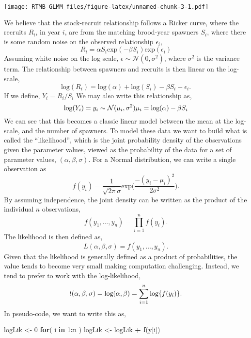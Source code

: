 \documentclass[
]{article}
\newenvironment{Shaded}{\begin{snugshade}}{\end{snugshade}}
\newcommand{\ControlFlowTok}[1]{\textcolor[rgb]{0.13,0.29,0.53}{\textbf{#1}}}
\newcommand{\DecValTok}[1]{\textcolor[rgb]{0.00,0.00,0.81}{#1}}
\newcommand{\FunctionTok}[1]{\textcolor[rgb]{0.13,0.29,0.53}{\textbf{#1}}}
\newcommand{\NormalTok}[1]{#1}
\newcommand{\OtherTok}[1]{\textcolor[rgb]{0.56,0.35,0.01}{#1}}
\newcommand{\SpecialCharTok}[1]{\textcolor[rgb]{0.81,0.36,0.00}{\textbf{#1}}}
\begin{document}
\texttt{[image: RTMB\_GLMM\_files/figure-latex/unnamed-chunk-3-1.pdf]}

We believe that the stock-recruit relationship follows a Ricker curve,
where the recruits \(R_i\), in year \(i\), are from the matching
brood-year spawners \(S_i\), where there is some random noise on the
observed relationship \(\epsilon_i\), \[
  R_i = \alpha S_i \text{exp}(-\beta S_i) \text{exp}(\epsilon_i)
\] Assuming white noise on the log scale,
\(\epsilon \sim \mathcal{N}(0,\sigma^2)\), where \(\sigma^2\) is the
variance term. The relationship between spawners and recruits is then
linear on the log-scale, \[
  \text{log}(R_i) = \text{log}(\alpha) + \text{log}(S_i) - \beta S_i + \epsilon_i.
\] If we define, \(Y_i = R_i/S_i\) We may also write this relationship
as, \[
  \text{log}(Y_i) = y_i \sim \mathcal{N}(\mu_i, \sigma^2)\\
  \mu_i = \text{log}(\alpha) - \beta S_i
\] We can see that this becomes a classic linear model between the mean
at the log-scale, and the number of spawners. To model these data we
want to build what is called the ``likelihood'', which is the joint
probability density of the observations given the parameter values,
viewed as the probability of the data for a set of parameter values,
\((\alpha, \beta, \sigma)\). For a Normal distribution, we can write a
single observation as \[
  f(y_i) = \frac{1}{\sqrt{2\pi}\sigma}\text{exp}\Big(\frac{-(y_i-\mu_i)^2}{2\sigma^2}\Big).
\] By assuming independence, the joint density can be written as the
product of the individual \(n\) observations, \[
  f(y_1,\ldots,y_n) = \prod_{i=1}^n f(y_i).
\] The likelihood is then defined as, \[
  L(\alpha, \beta, \sigma) = f(y_1,\ldots,y_n).
\] Given that the likelihood is generally defined as a product of
probabilities, the value tends to become very small making computation
challenging. Instead, we tend to prefer to work with the log-likelihood,
\[
  l(\alpha, \beta, \sigma) = \text{log}(\alpha, \beta)\\
                   = \sum_{i=1}^n \text{log}\{f(y_i)\}.
\] In pseudo-code, we want to write this as,

\begin{Shaded}
\begin{Highlighting}[]
\NormalTok{  logLik }\OtherTok{\textless{}{-}} \DecValTok{0}
  \ControlFlowTok{for}\NormalTok{( i }\ControlFlowTok{in} \DecValTok{1}\SpecialCharTok{:}\NormalTok{n ) logLik }\OtherTok{\textless{}{-}}\NormalTok{ logLik }\SpecialCharTok{+} \FunctionTok{f}\NormalTok{(y[i])}
\end{Highlighting}
\end{Shaded}
\end{document}
